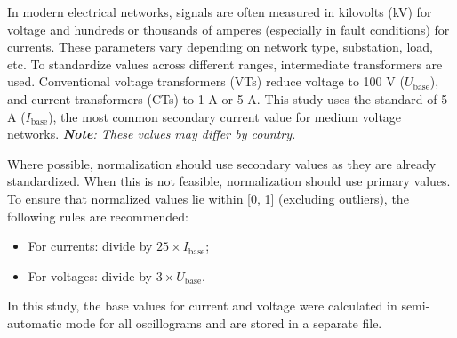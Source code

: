 \documentclass{article}
\begin{document}
In modern electrical networks, signals are often measured in kilovolts (kV) for voltage and hundreds or thousands of amperes (especially in fault conditions) for currents. These parameters vary depending on network type, substation, load, etc. To standardize values across different ranges, intermediate transformers are used. Conventional voltage transformers (VTs) reduce voltage to 100 V (\( U_\text{base} \)), and current transformers (CTs) to 1 A or 5 A. This study uses the standard of 5 A (\(I_\text{base} \)), the most common secondary current value for medium voltage networks. \textit{\textbf{Note}: These values may differ by country.}

Where possible, normalization should use secondary values as they are already standardized. When this is not feasible, normalization should use primary values. To ensure that normalized values lie within [0, 1] (excluding outliers), the following rules are recommended:

\begin{itemize}
    \item For currents: divide by \( 25 \times I_{\text{base}} \);
    \item For voltages: divide by \( 3 \times U_{\text{base}} \).
\end{itemize}

In this study, the base values for current and voltage were calculated in semi-automatic mode for all oscillograms and are stored in a separate file.


\end{document}
